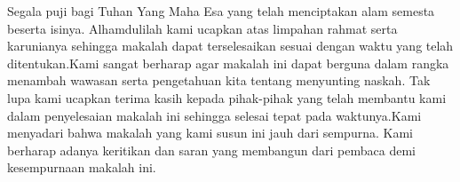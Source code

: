 \begin{acknowledgements}
Segala puji bagi Tuhan Yang Maha Esa yang telah menciptakan alam semesta beserta isinya. Alhamdulilah kami ucapkan atas limpahan rahmat serta karunianya sehingga makalah dapat terselesaikan sesuai dengan waktu yang telah ditentukan.Kami sangat berharap agar makalah ini dapat berguna dalam rangka menambah wawasan serta pengetahuan kita tentang menyunting naskah. Tak lupa kami ucapkan terima kasih kepada pihak-pihak yang telah membantu kami dalam penyelesaian makalah ini sehingga selesai tepat pada waktunya.Kami menyadari bahwa makalah yang kami susun ini jauh dari sempurna. Kami berharap adanya keritikan dan saran yang membangun dari pembaca  demi kesempurnaan makalah ini.
\end{acknowledgements}